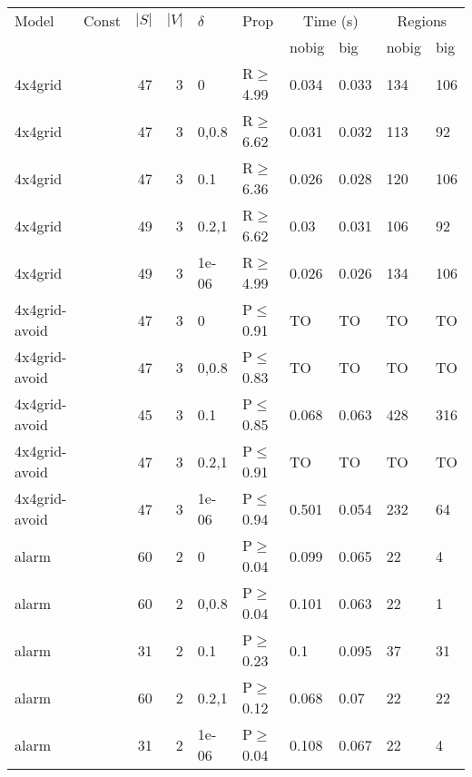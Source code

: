 \begin{longtable}{llrrllllll}

        \toprule
        Model & Const & $|S|$ & $|V|$ & $\delta$ & Prop & \multicolumn{2}{c}{Time (s)} & \multicolumn{2}{c}{Regions} \\
        \cmidrule(ll){7-8} \cmidrule(ll){9-10}
        & & & & & & nobig & big & nobig & big \\
        \midrule
        
 4x4grid       &           &     	47 &    3 & 0     & R$\geq$4.99  & 0.034   & 0.033    & 134    & 106    \\
 4x4grid       &           &     	47 &    3 & 0,0.8 & R$\geq$6.62  & 0.031   & 0.032    & 113    & 92     \\
 4x4grid       &           &     	47 &    3 & 0.1   & R$\geq$6.36  & 0.026   & 0.028    & 120    & 106    \\
 4x4grid       &           &     	49 &    3 & 0.2,1 & R$\geq$6.62  & 0.03    & 0.031    & 106    & 92     \\
 4x4grid       &           &     	49 &    3 & 1e-06 & R$\geq$4.99  & 0.026   & 0.026    & 134    & 106    \\
 4x4grid-avoid &           &     	47 &    3 & 0     & P$\leq$0.91  & TO      & TO       & TO     & TO     \\
 4x4grid-avoid &           &     	47 &    3 & 0,0.8 & P$\leq$0.83  & TO      & TO       & TO     & TO     \\
 4x4grid-avoid &           &     	45 &    3 & 0.1   & P$\leq$0.85  & 0.068   & 0.063    & 428    & 316    \\
 4x4grid-avoid &           &     	47 &    3 & 0.2,1 & P$\leq$0.91  & TO      & TO       & TO     & TO     \\
 4x4grid-avoid &           &     	47 &    3 & 1e-06 & P$\leq$0.94  & 0.501   & 0.054    & 232    & 64     \\
 alarm         &           &     	60 &    2 & 0     & P$\geq$0.04  & 0.099   & 0.065    & 22     & 4      \\
 alarm         &           &     	60 &    2 & 0,0.8 & P$\geq$0.04  & 0.101   & 0.063    & 22     & 1      \\
 alarm         &           &     	31 &    2 & 0.1   & P$\geq$0.23  & 0.1     & 0.095    & 37     & 31     \\
 alarm         &           &     	60 &    2 & 0.2,1 & P$\geq$0.12  & 0.068   & 0.07     & 22     & 22     \\
 alarm         &           &     	31 &    2 & 1e-06 & P$\geq$0.04  & 0.108   & 0.067    & 22     & 4      \\

\end{longtable}
